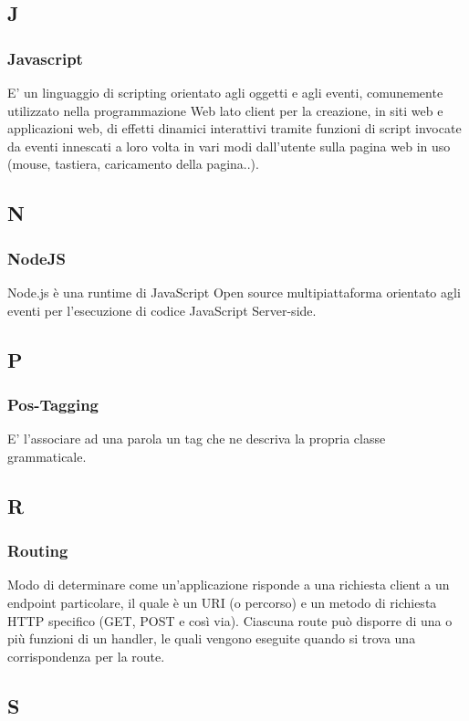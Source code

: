 	\subsection*{J}
	\subsubsection*{Javascript}
	E' un linguaggio di scripting orientato agli oggetti e agli eventi, comunemente utilizzato nella programmazione Web lato client per la creazione, in siti web e applicazioni web, di effetti dinamici interattivi tramite funzioni di script invocate da eventi innescati a loro volta in vari modi dall'utente sulla pagina web in uso (mouse, tastiera, caricamento della pagina..).
	
		\subsection*{N}
	\subsubsection*{NodeJS}
	Node.js è una runtime di JavaScript Open source multipiattaforma orientato agli eventi per l'esecuzione di codice JavaScript Server-side.
	
	\subsection*{P}
	\subsubsection*{Pos-Tagging}
	E' l'associare ad una parola un tag che ne descriva la propria classe grammaticale.
	
	\subsection*{R}
	\subsubsection*{Routing}
	Modo di determinare come un’applicazione risponde a una richiesta client a un endpoint particolare,
	il quale è un URI (o percorso) e un metodo di richiesta HTTP specifico (GET, POST e così via).
	Ciascuna route può disporre di una o più funzioni di un handler, le quali vengono eseguite quando si
	trova una corrispondenza per la route.
	
	\subsection*{S}
